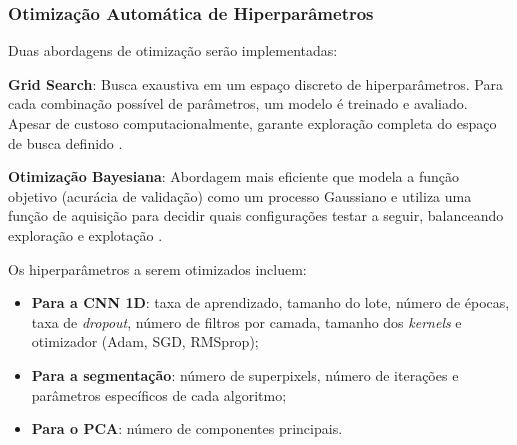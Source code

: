 \subsubsection{Otimização Automática de Hiperparâmetros}

Duas abordagens de otimização serão implementadas:

\textbf{Grid Search}: Busca exaustiva em um espaço discreto de hiperparâmetros. Para cada combinação possível de parâmetros, um modelo é treinado e avaliado. Apesar de custoso computacionalmente, garante exploração completa do espaço de busca definido \cite{liashchynskyi2019gridsearchrandomsearch}.

\textbf{Otimização Bayesiana}: Abordagem mais eficiente que modela a função objetivo (acurácia de validação) como um processo Gaussiano e utiliza uma função de aquisição para decidir quais configurações testar a seguir, balanceando exploração e explotação \cite{WU201926}.

Os hiperparâmetros a serem otimizados incluem:

\begin{itemize}
    \item \textbf{Para a CNN 1D}: taxa de aprendizado, tamanho do lote, número de épocas, taxa de \textit{dropout}, número de filtros por camada, tamanho dos \textit{kernels} e otimizador (Adam, SGD, RMSprop);
    \item \textbf{Para a segmentação}: número de superpixels, número de iterações e parâmetros específicos de cada algoritmo;
    \item \textbf{Para o PCA}: número de componentes principais.
\end{itemize}

